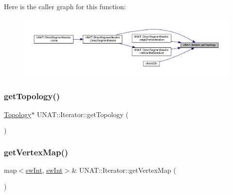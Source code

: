 Here is the caller graph for this function\+:
\nopagebreak
\begin{figure}[H]
\begin{center}
\leavevmode
\includegraphics[width=350pt]{classUNAT_1_1Iterator_a22ec6ca24e5c28053cbda5a1970fe86c_icgraph}
\end{center}
\end{figure}
\mbox{\label{classUNAT_1_1Iterator_a22ec6ca24e5c28053cbda5a1970fe86c}} 
\subsubsection{\texorpdfstring{getTopology()}{getTopology()}\hspace{0.1cm}{\footnotesize\ttfamily [2/2]}}
{\footnotesize\ttfamily \mbox{\hyperlink{classUNAT_1_1Topology}{Topology}}$\ast$ U\+N\+A\+T\+::\+Iterator\+::get\+Topology (\begin{DoxyParamCaption}{ }\end{DoxyParamCaption})\hspace{0.3cm}{\ttfamily [inline]}}

\mbox{\label{classUNAT_1_1Iterator_ac05240478478b3d1aba6af28e364cf50}} 
\subsubsection{\texorpdfstring{getVertexMap()}{getVertexMap()}\hspace{0.1cm}{\footnotesize\ttfamily [1/2]}}
{\footnotesize\ttfamily map$<$\mbox{\hyperlink{include_2swMacro_8h_a113cf5f6b5377cdf3fac6aa4e443e9aa}{sw\+Int}}, \mbox{\hyperlink{include_2swMacro_8h_a113cf5f6b5377cdf3fac6aa4e443e9aa}{sw\+Int}}$>$\& U\+N\+A\+T\+::\+Iterator\+::get\+Vertex\+Map (\begin{DoxyParamCaption}{ }\end{DoxyParamCaption})\hspace{0.3cm}{\ttfamily [inline]}}

